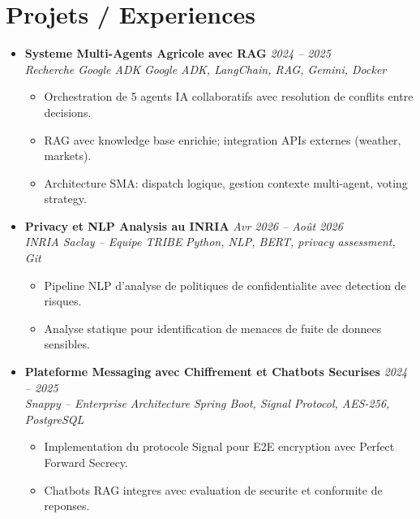 \documentclass[a4paper,11pt]{article}
\begin{document}
\section{Projets / Experiences}
\begin{itemize}[leftmargin=*, label={-}]

\item \textbf{Systeme Multi-Agents Agricole avec RAG} \hfill \textit{2024 -- 2025} \\
\textit{Recherche Google ADK} \hfill \textit{Google ADK, LangChain, RAG, Gemini, Docker}
\vspace{-2pt}
    \begin{itemize}[leftmargin=0.4cm, nosep, label=\tiny$\bullet$]
        \item \small{Orchestration de 5 agents IA collaboratifs avec resolution de conflits entre decisions.}
        \item \small{RAG avec knowledge base enrichie; integration APIs externes (weather, markets).}
        \item \small{Architecture SMA: dispatch logique, gestion contexte multi-agent, voting strategy.}
    \end{itemize}
\vspace{3pt}

\item \textbf{Privacy et NLP Analysis au INRIA} \hfill \textit{Avr 2026 -- Ao\^ut 2026} \\
\textit{INRIA Saclay -- Equipe TRIBE} \hfill \textit{Python, NLP, BERT, privacy assessment, Git}
\vspace{-2pt}
    \begin{itemize}[leftmargin=0.4cm, nosep, label=\tiny$\bullet$]
        \item \small{Pipeline NLP d'analyse de politiques de confidentialite avec detection de risques.}
        \item \small{Analyse statique pour identification de menaces de fuite de donnees sensibles.}
    \end{itemize}
\vspace{3pt}

\item \textbf{Plateforme Messaging avec Chiffrement et Chatbots Securises} \hfill \textit{2024 -- 2025} \\
\textit{Snappy -- Enterprise Architecture} \hfill \textit{Spring Boot, Signal Protocol, AES-256, PostgreSQL}
\vspace{-2pt}
    \begin{itemize}[leftmargin=0.4cm, nosep, label=\tiny$\bullet$]
        \item \small{Implementation du protocole Signal pour E2E encryption avec Perfect Forward Secrecy.}
        \item \small{Chatbots RAG integres avec evaluation de securite et conformite de reponses.}
    \end{itemize}
\vspace{3pt}


\end{itemize}
\end{document}
